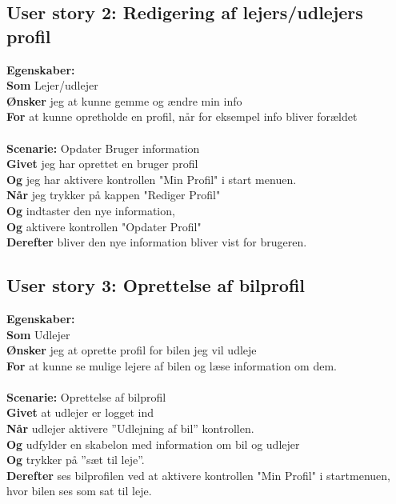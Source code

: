 \documentclass[Kravspecifikation/Kravspec_Main.tex]{subfiles}
\begin{document}
\subsection{User story 2: Redigering af lejers/udlejers profil}
\textbf{Egenskaber:}  \\
\textbf{Som} Lejer/udlejer \\
\textbf{Ønsker} jeg at kunne gemme og ændre min info \\
\textbf{For} at kunne opretholde en profil, når for eksempel info bliver forældet 
\\\\
\textbf{Scenarie:} Opdater Bruger information\\
    \textbf{Givet} jeg har oprettet en bruger profil\\
    \textbf{Og} jeg har aktivere kontrollen "Min Profil" i start menuen.\\
	\textbf{Når} jeg trykker på kappen "Rediger Profil"\\
	\textbf{Og} indtaster den nye information,\\
	\textbf{Og} aktivere kontrollen "Opdater Profil"\\
	\textbf{Derefter} bliver den nye information bliver vist for brugeren.



\subsection{User story 3: Oprettelse af bilprofil}
\textbf{Egenskaber:} \\
\textbf{Som} Udlejer \\ 
\textbf{Ønsker} jeg at oprette profil for bilen jeg vil udleje \\
\textbf{For} at kunne se mulige lejere af bilen og læse information om dem.\\\\ 
\textbf{Scenarie:} Oprettelse af bilprofil \\
\textbf{Givet} at udlejer er logget ind\\ 
\textbf{Når} udlejer aktivere ”Udlejning af bil” kontrollen. \\
\textbf{Og} udfylder en skabelon med information om bil og udlejer\\
\textbf{Og} trykker på ”sæt til leje”. \\ 
\textbf{Derefter} ses bilprofilen ved at aktivere kontrollen "Min Profil" i startmenuen, hvor bilen ses som sat til leje.
\end{document}
